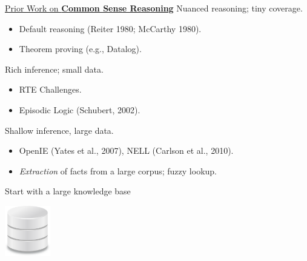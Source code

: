 \begin{frame}{\uline{Prior Work on \textbf{Common Sense Reasoning}}}
 Nuanced reasoning; tiny coverage.
\begin{itemize}
  \item Default reasoning (Reiter 1980; McCarthy 1980).
  \item Theorem proving (e.g., Datalog).
\end{itemize}
\vspace{0.5cm}
\pause

 Rich inference; small data.
\begin{itemize}
  \item RTE Challenges.
  \item Episodic Logic (Schubert, 2002).
\end{itemize}
\vspace{0.5cm}
\pause

 Shallow inference, large data.
\begin{itemize}
  \item OpenIE (Yates et al., 2007), NELL (Carlson et al., 2010).
  \item \textit{Extraction} of facts from a large corpus; fuzzy lookup.
\end{itemize}
\end{frame}


\begin{frame}{Start with a large knowledge base}
\begin{center}
  \hspace{0.8cm}
  \includegraphics[height=2.2cm]{../../img/database.png}
\end{center}
\end{frame}

